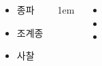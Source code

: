 \documentclass[20pt, a0paper, landscape]{tikzposter}
\begin{document}
\begin{columns}
{\begin{LARGE}
\begin{itemize}
					\item 종파
					\item 조계종

					\item 사찰


					\end{itemize}
				\end{LARGE}
			} %


			{
					\setlength{\leftmargini}{3em}
					\setlength{\labelsep} {1em}
				\begin{LARGE}
					\begin{itemize}
					\item 
					\item 
					\item 
					\end{itemize}
				\end{LARGE}
			} %







	\end{columns}
\end{document}
